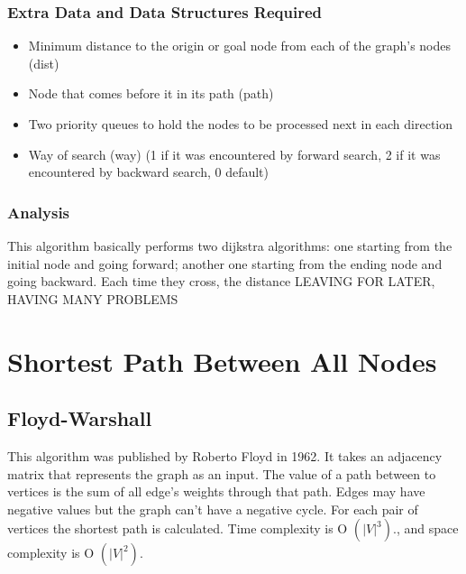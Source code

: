 \subsubsection{Extra Data and Data Structures Required}
\begin{itemize}
    \item Minimum distance to the origin or goal node from each of the graph's nodes (dist)
    \item Node that comes before it in its path (path)
    \item Two priority queues to hold the nodes to be processed next in each direction
    \item Way of search (way) (1 if it was encountered by forward search, 2 if it was encountered by backward search, 0 default)
\end{itemize}



\subsubsection{Analysis}
This algorithm basically performs two dijkstra algorithms: one starting from the initial node and going forward; another one starting from the ending node and going backward. Each time they cross, the distance LEAVING FOR LATER, HAVING MANY PROBLEMS

\section{Shortest Path Between All Nodes}

\subsection{Floyd-Warshall}
This algorithm was published by Roberto Floyd in 1962.
It takes an adjacency matrix that represents the graph as an input. The value of a path between to vertices is the sum of all edge's weights through that path. Edges may have negative values but the graph can't have a negative cycle.
For each pair of vertices the shortest path is calculated. Time complexity is O \begin{math}(|V| ^3).\end{math}, and space complexity is O \begin{math}(|V| ^2).\end{math}



